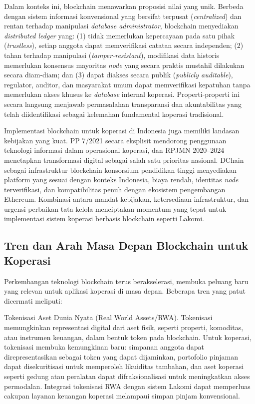 Dalam konteks ini, blockchain menawarkan proposisi nilai yang unik. Berbeda dengan sistem informasi konvensional yang bersifat terpusat (\textit{centralized}) dan rentan terhadap manipulasi \textit{database administrator}, blockchain menyediakan \textit{distributed ledger} yang: (1) tidak memerlukan kepercayaan pada satu pihak (\textit{trustless}), setiap anggota dapat memverifikasi catatan secara independen; (2) tahan terhadap manipulasi (\textit{tamper-resistant}), modifikasi data historis memerlukan konsensus mayoritas \textit{node} yang secara praktis mustahil dilakukan secara diam-diam; dan (3) dapat diakses secara publik (\textit{publicly auditable}), regulator, auditor, dan masyarakat umum dapat memverifikasi kepatuhan tanpa memerlukan akses khusus ke \textit{database} internal koperasi. Properti-properti ini secara langsung menjawab permasalahan transparansi dan akuntabilitas yang telah diidentifikasi sebagai kelemahan fundamental koperasi tradisional.

Implementasi blockchain untuk koperasi di Indonesia juga memiliki landasan kebijakan yang kuat. PP 7/2021 \cite{pp72021} secara eksplisit mendorong penggunaan teknologi informasi dalam operasional koperasi, dan RPJMN 2020--2024 menetapkan transformasi digital sebagai salah satu prioritas nasional. DChain sebagai infrastruktur blockchain konsorsium pendidikan tinggi menyediakan platform yang sesuai dengan konteks Indonesia, biaya rendah, identitas \textit{node} terverifikasi, dan kompatibilitas penuh dengan ekosistem pengembangan Ethereum. Kombinasi antara mandat kebijakan, ketersediaan infrastruktur, dan urgensi perbaikan tata kelola menciptakan momentum yang tepat untuk implementasi sistem koperasi berbasis blockchain seperti Lakomi.

\subsection{Tren dan Arah Masa Depan Blockchain untuk Koperasi}

Perkembangan teknologi blockchain terus berakselerasi, membuka peluang baru yang relevan untuk aplikasi koperasi di masa depan. Beberapa tren yang patut dicermati meliputi:

Tokenisasi Aset Dunia Nyata (Real World Assets/RWA). Tokenisasi memungkinkan representasi digital dari aset fisik, seperti properti, komoditas, atau instrumen keuangan, dalam bentuk token pada blockchain. Untuk koperasi, tokenisasi membuka kemungkinan baru: simpanan anggota dapat direpresentasikan sebagai token yang dapat dijaminkan, portofolio pinjaman dapat disekuritisasi untuk memperoleh likuiditas tambahan, dan aset koperasi seperti gedung atau peralatan dapat difraksionalisasi untuk meningkatkan akses permodalan. Integrasi tokenisasi RWA dengan sistem Lakomi dapat memperluas cakupan layanan keuangan koperasi melampaui simpan pinjam konvensional.

